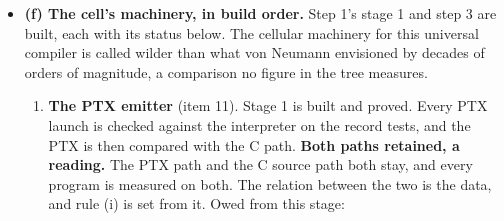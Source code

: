 \begin{enumerate}
\begin{itemize}
\begin{itemize}
\item \textbf{More basic questions, a reading.} When a question kills the process, the next question has to be more basic and asked from a fresh process. The cell that watches the probes, and the limit on what it knows, are posit 12 (\hyperref[chap:wants]{wants.md}).
\end{itemize}
\item \textbf{(f) The cell's machinery, in build order.} Step 1's stage 1 and step 3 are built, each with its status below. The cellular machinery for this universal compiler is called wilder than what von Neumann envisioned by decades of orders of magnitude, a comparison no figure in the tree measures.

\begin{enumerate}
\item \textbf{The PTX emitter} (item 11). Stage 1 is built and proved. Every PTX launch is checked against the interpreter on the record tests, and the PTX is then compared with the C path. \textbf{Both paths retained, a reading.} The PTX path and the C source path both stay, and every program is measured on both. The relation between the two is the data, and rule (i) is set from it. Owed from this stage:


\end{enumerate}
\end{itemize}
\end{enumerate}
